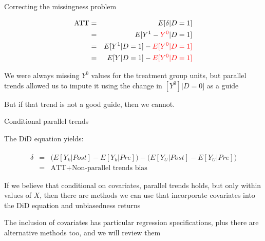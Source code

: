 \documentclass{beamer}
\begin{document}
\begin{frame}{Correcting the missingness problem}

\begin{eqnarray*}
\text{ATT} &=& E[\delta | D=1] \\
&=& E[Y^1-\textcolor{red}{Y^0} | D=1] \\
&=& E[Y^1 | D=1] - \textcolor{red}{E[Y^0|D=1]} \\
&=& E[Y | D=1] - \textcolor{red}{E[Y^0|D=1]} 
\end{eqnarray*}

\bigskip

We were always missing $Y^0$ values for the treatment group units, but parallel trends allowed us to impute it using the change in $[Y^0]|D=0]$ as a guide

\bigskip

But if that trend is not a good guide, then we cannot.  


\end{frame}


\begin{frame}{Conditional parallel trends}

The DiD equation yields:

\begin{eqnarray*}
\widehat{\delta} &=& \bigg ( E[Y_k|Post] - E[Y_k|Pre] \bigg ) - \bigg ( E[Y_U | Post ] - E[ Y_U | Pre] \bigg) \\
&=& \text{ATT} + \text{Non-parallel trends bias}
\end{eqnarray*}

\bigskip

If we believe that conditional on covariates, parallel trends holds, but only within values of $X$, then there are methods we can use that incorporate covariates into the DiD equation and unbiasedness returns

\bigskip 

The inclusion of covariates has particular regression specifications, plus there are alternative methods too, and we will review them

\end{frame}
\end{document}
